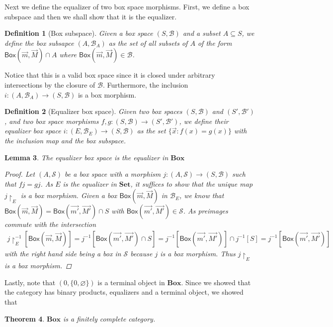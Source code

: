 \documentclass[12pt]{article}
\newtheorem{theorem}{Theorem}[section]
\newtheorem{lemma}[theorem]{Lemma}
\newtheorem{definition}[theorem]{Definition}
\newcommand{\bobject}{\mathsf{Box}}
\begin{document}
Next we define the equalizer of two box space morphisms. First, we define a box subspace
and then we shall show that it is the equalizer.
\begin{definition}[Box subspace]
    Given a box space $(S,\mathcal{B})$ and a subset $A\subseteq S$,
    we define the box subsapce $(A,\mathcal{B}_A)$ as the set of all subsets of $A$
    of the form $\bobject(\vec{m},\vec{M})\cap A$ where $\bobject(\vec{m},\vec{M})\in\mathcal{B}$.
\end{definition}
Notice that this is a valid box space since it is closed under arbitrary intersections by the 
closure of $\mathcal{B}$. Furthermore, the inclusion $i:(A,\mathcal{B}_A)\to(S,\mathcal{B})$
is a box morphism.
\begin{definition}[Equalizer box space]
    Given two box spaces $(S,\mathcal{B})$ and $(S',\mathcal{B}')$,
    and two box space morphisms $f,g:(S,\mathcal{B})\to(S',\mathcal{B}')$,
    we define their equalizer box space
    $i:(E,\mathcal{B}_E)\to(S,\mathcal{B})$ as the set $\{\vec{x}:f(x)=g(x)\}$ with the inclusion
    map and the box subspace.
\end{definition}
\begin{lemma}
    The equalizer box space is the equalizer in $\mathbf{Box}$
    \begin{proof}
        Let $(A,\mathcal{S})$ be a box space with a morphism $j:(A,\mathcal{S})\to(S,\mathcal{B})$
        such that $fj=gj$. As $E$ is the equalizer in $\mathbf{Set}$, 
        it suffices to show that the unique map
        $j\restriction_E$ is a box morphism. Given a box $\bobject(\vec{m},\vec{M})$ in $\mathcal{B}_E$, we know that
        $\bobject(\vec{m},\vec{M})=\bobject(\vec{m'},\vec{M'})\cap S$ with $\bobject(\vec{m'},\vec{M'})\in\mathcal{S}$.
        As preimages commute with the intersection
        \begin{gather*}
            j\restriction_E^{-1}[\bobject(\vec{m},\vec{M})]=j^{-1}[\bobject(\vec{m'},\vec{M'})\cap S]=
            j^{-1}[\bobject(\vec{m'},\vec{M'})]\cap j^{-1}[S]=j^{-1}[\bobject(\vec{m'},\vec{M'})]
        \end{gather*}
        with the right hand side being a box in $\mathcal{S}$ because $j$ is a box morphism.
        Thus $j\restriction_E$ is a box morphism.
    \end{proof}
\end{lemma}
Lastly, note that $(0,\{0,\varnothing\})$ is a terminal object in $\mathbf{Box}$. Since we
showed that the category has binary products, equalizers and a terminal object, we showed that
\begin{theorem}
    $\mathbf{Box}$ is a finitely complete category.
\end{theorem}
\end{document}
